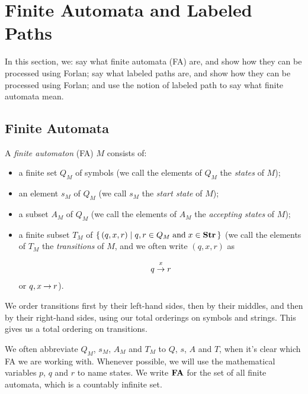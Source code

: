 \section{Finite Automata and Labeled Paths}
\label{FiniteAutomataAndLabeledPaths}


In this section, we: say what finite automata (FA) are, and show how
they can be processed using Forlan; say what labeled paths are, and
show how they can be processed using Forlan; and use the notion of
labeled path to say what finite automata mean.

\subsection{Finite Automata}

A \emph{finite automaton} (FA) $M$ consists of:
\begin{itemize}
\item a finite set $Q_M$ of symbols (we call the elements of $Q_M$
the \emph{states} of $M$);

\item an element $s_M$ of $Q_M$ (we call $s_M$ the \emph{start state}
of $M$);

\item a subset $A_M$ of $Q_M$ (we call the elements of $A_M$ the
\emph{accepting states} of $M$);

\item a finite subset $T_M$ of $\{ \, (q,x,r) \mid q,r\in Q_M\;\allowbreak\mbox{and}\allowbreak\;
x\in\mathbf{Str} \, \}$ (we call the elements of $T_M$ the \emph{transitions} of
$M$, and we often write $(q, x, r)$ as
\begin{gather*}
q\stackrel{\strut x}{\rightarrow}r
\end{gather*}
or $q,x\mathbin{\to} r$).
\end{itemize}
%
%
%
%

We order transitions first by their left-hand sides, then by their
middles, and then by their right-hand sides, using our total orderings
on symbols and strings.  This gives us a total ordering on
transitions.

We often abbreviate $Q_M$, $s_M$, $A_M$ and $T_M$ to $Q$, $s$, $A$ and
$T$, when it's clear which FA we are working with.  Whenever possible,
we will use the mathematical variables $p$, $q$ and $r$ to name
states.  We write $\mathbf{FA}$ for the set of all finite automata, which is a
%
countably infinite set.

